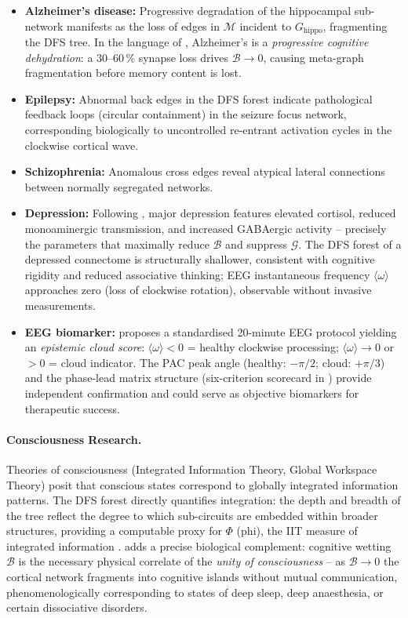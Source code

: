 ﻿\documentclass[12pt,a4paper]{article}
\theoremstyle{plain}
\theoremstyle{definition}
\theoremstyle{remark}
\begin{document}
	\begin{itemize}
		\item \textbf{Alzheimer's disease:} Progressive degradation of the
		hippocampal sub-network manifests as the loss of edges in $\mathcal{M}$
		incident to $G_{\text{hippo}}$, fragmenting the DFS tree.  In the
		language of \cite{epp2026brain}, Alzheimer's is a \emph{progressive
			cognitive dehydration}: a $30$--$60\,\%$ synapse loss drives
		$\mathcal{B} \to 0$, causing meta-graph fragmentation before
		memory content is lost.
		\item \textbf{Epilepsy:} Abnormal back edges in the DFS forest indicate
		pathological feedback loops (circular containment) in the seizure
		focus network, corresponding biologically to uncontrolled re-entrant
		activation cycles in the clockwise cortical wave.
		\item \textbf{Schizophrenia:} Anomalous cross edges reveal atypical
		lateral connections between normally segregated networks.
		\item \textbf{Depression:} Following \cite{epp2026brain}, major
		depression features elevated cortisol, reduced monoaminergic
		transmission, and increased GABAergic activity -- precisely the
		parameters that maximally reduce $\mathcal{B}$ and suppress
		$\mathcal{G}$.  The DFS forest of a depressed connectome is
		structurally shallower, consistent with cognitive rigidity and
		reduced associative thinking; EEG instantaneous frequency
		$\langle\omega\rangle$ approaches zero (loss of clockwise rotation),
		observable without invasive measurements.
		\item \textbf{EEG biomarker:} \cite{epp2026brain} proposes a
		standardised 20-minute EEG protocol yielding an \emph{epistemic
			cloud score}: $\langle\omega\rangle < 0$ = healthy clockwise
		processing; $\langle\omega\rangle \to 0$ or $> 0$ = cloud indicator.
		The PAC peak angle (healthy: $-\pi/2$; cloud: $+\pi/3$) and the
		phase-lead matrix structure (six-criterion scorecard in
		\cite{epp2026brain}) provide independent confirmation and could
		serve as objective biomarkers for therapeutic success.
	\end{itemize}
	
	\paragraph{Consciousness Research.}
	Theories of consciousness (Integrated Information Theory, Global Workspace
	Theory) posit that conscious states correspond to globally integrated
	information patterns.  The DFS forest directly quantifies integration: the
	depth and breadth of the tree reflect the degree to which sub-circuits are
	embedded within broader structures, providing a computable proxy for
	$\Phi$ (phi), the IIT measure of integrated information \cite{iit}.
	\cite{epp2026brain} adds a precise biological complement: cognitive wetting
	$\mathcal{B}$ is the necessary physical correlate of the \emph{unity of
		consciousness} -- as $\mathcal{B} \to 0$ the cortical network fragments
	into cognitive islands without mutual communication, phenomenologically
	corresponding to states of deep sleep, deep anaesthesia, or certain
	dissociative disorders.
	
\end{document}
